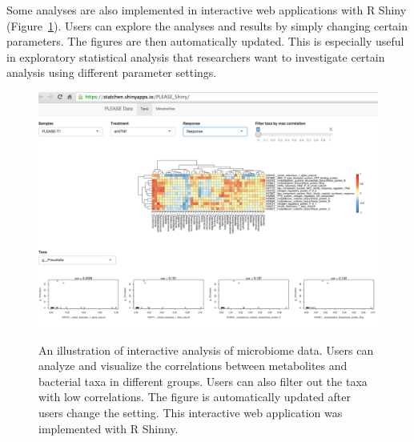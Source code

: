Some analyses are also implemented in interactive web applications with R Shiny (Figure~\ref{F64_Shiny}). Users can explore the analyses and results  by simply changing certain parameters. The figures are then  automatically updated. This is especially useful in exploratory statistical analysis that researchers want to investigate  certain  analysis using  different parameter settings.


\begin{figure}[p]
	\centering
	{\includegraphics[scale=0.4,trim=0 0 0 0,clip]{Figure/F64_Shiny.pdf}
	}
	\caption[An illustration of interactive analysis of microbiome data]{An illustration of interactive analysis of microbiome data. Users can analyze and visualize the correlations between metabolites and bacterial taxa in different groups. Users  can also filter out the taxa with low correlations. The figure is  automatically updated after users change the setting. This interactive web application was implemented with R Shinny. 
	}
	\label{F64_Shiny}
\end{figure}